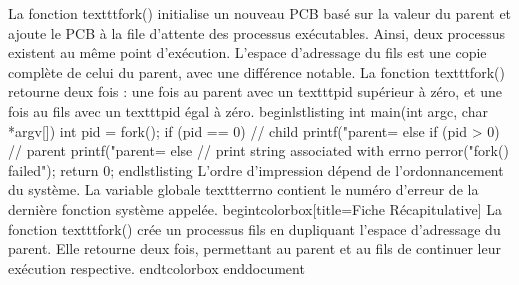 La fonction texttt{fork()} initialise un nouveau PCB basé sur la valeur du parent et ajoute le PCB à la file d'attente des processus exécutables. Ainsi, deux processus existent au même point d'exécution.
L'espace d'adressage du fils est une copie complète de celui du parent, avec une différence notable. La fonction texttt{fork()} retourne deux fois : une fois au parent avec un texttt{pid} supérieur à zéro, et une fois au fils avec un texttt{pid} égal à zéro.
begin{lstlisting}
int main(int argc, char *argv[]) {
    int pid = fork();
    if (pid == 0) {
        // child
        printf("parent=%
    } else if (pid > 0) {
        // parent
        printf("parent=%
    } else {
        // print string associated with errno
        perror("fork() failed");
    }
    return 0;
}
end{lstlisting}
L'ordre d'impression dépend de l'ordonnancement du système. La variable globale texttt{errno} contient le numéro d'erreur de la dernière fonction système appelée.
begin{tcolorbox}[title={Fiche Récapitulative}]
La fonction texttt{fork()} crée un processus fils en dupliquant l'espace d'adressage du parent. Elle retourne deux fois, permettant au parent et au fils de continuer leur exécution respective.
end{tcolorbox}
end{document}